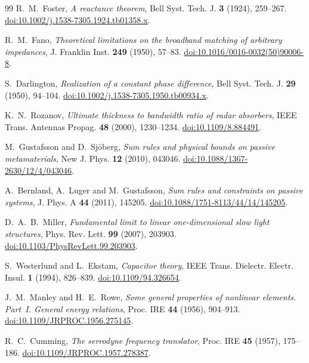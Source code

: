 \begin{thebibliography}{99}
R.~M.~Foster,
\emph{A reactance theorem},
Bell Syst. Tech. J. \textbf{3} (1924), 259--267.
\href{https://doi.org/10.1002/j.1538-7305.1924.tb01358.x}{doi:10.1002/j.1538-7305.1924.tb01358.x}.

R.~M.~Fano,
\emph{Theoretical limitations on the broadband matching of arbitrary impedances},
J. Franklin Inst. \textbf{249} (1950), 57--83.
\href{https://doi.org/10.1016/0016-0032(50)90006-8}{doi:10.1016/0016-0032(50)90006-8}.

S.~Darlington,
\emph{Realization of a constant phase difference},
Bell Syst. Tech. J. \textbf{29} (1950), 94--104.
\href{https://doi.org/10.1002/j.1538-7305.1950.tb00934.x}{doi:10.1002/j.1538-7305.1950.tb00934.x}.

K.~N.~Rozanov,
\emph{Ultimate thickness to bandwidth ratio of radar absorbers},
IEEE Trans. Antennas Propag. \textbf{48} (2000), 1230--1234.
\href{https://doi.org/10.1109/8.884491}{doi:10.1109/8.884491}.

M.~Gustafsson and D.~Sj\"oberg,
\emph{Sum rules and physical bounds on passive metamaterials},
New J. Phys. \textbf{12} (2010), 043046.
\href{https://doi.org/10.1088/1367-2630/12/4/043046}{doi:10.1088/1367-2630/12/4/043046}.

A.~Bernland, A.~Luger and M.~Gustafsson,
\emph{Sum rules and constraints on passive systems},
J. Phys. A \textbf{44} (2011), 145205.
\href{https://doi.org/10.1088/1751-8113/44/14/145205}{doi:10.1088/1751-8113/44/14/145205}.

D.~A.~B.~Miller,
\emph{Fundamental limit to linear one-dimensional slow light structures},
Phys. Rev. Lett. \textbf{99} (2007), 203903.
\href{https://doi.org/10.1103/PhysRevLett.99.203903}{doi:10.1103/PhysRevLett.99.203903}.

S.~Westerlund and L.~Ekstam,
\emph{Capacitor theory},
IEEE Trans. Dielectr. Electr. Insul. \textbf{1} (1994), 826--839.
\href{https://doi.org/10.1109/94.326654}{doi:10.1109/94.326654}.

J.~M.~Manley and H.~E.~Rowe,
\emph{Some general properties of nonlinear elements. Part~I. General energy relations},
Proc. IRE \textbf{44} (1956), 904--913.
\href{https://doi.org/10.1109/JRPROC.1956.275145}{doi:10.1109/JRPROC.1956.275145}.

R.~C.~Cumming,
\emph{The serrodyne frequency translator},
Proc. IRE \textbf{45} (1957), 175--186.
\href{https://doi.org/10.1109/JRPROC.1957.278387}{doi:10.1109/JRPROC.1957.278387}.


\end{thebibliography}
